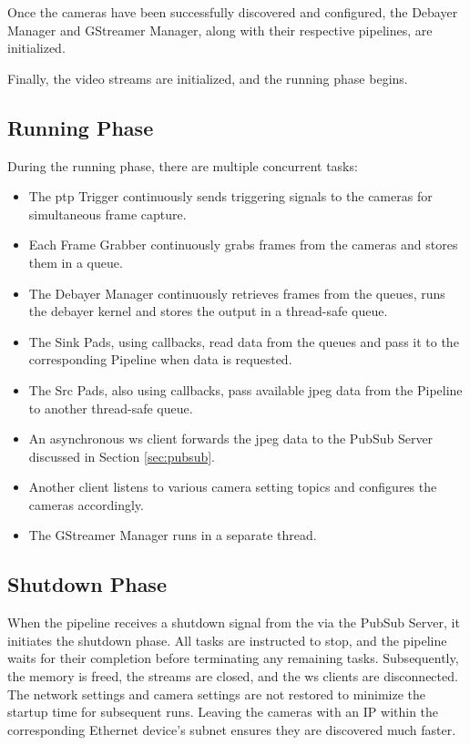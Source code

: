 Once the cameras have been successfully discovered and configured, the Debayer Manager and GStreamer Manager, along with their respective pipelines, are initialized.

Finally, the video streams are initialized, and the running phase begins.

\subsection{Running Phase}
During the running phase, there are multiple concurrent tasks:

\begin{itemize}
    \item The \gls{ptp} Trigger continuously sends triggering signals to the cameras for simultaneous frame capture.
    \item Each Frame Grabber continuously grabs frames from the cameras and stores them in a queue.
    \item The Debayer Manager continuously retrieves frames from the queues, runs the debayer kernel and stores the output in a thread-safe queue.
    \item The Sink Pads, using callbacks, read data from the queues and pass it to the corresponding Pipeline when data is requested.
    \item The Src Pads, also using callbacks, pass available \gls{jpeg} data from the Pipeline to another thread-safe queue.
    \item An asynchronous \gls{ws} client forwards the \gls{jpeg} data to the PubSub Server discussed in Section \ref{sec:pubsub}.
    \item Another client listens to various camera setting topics and configures the cameras accordingly.
    \item The GStreamer Manager runs in a separate thread.
\end{itemize}



\subsection{Shutdown Phase}

When the pipeline receives a shutdown signal from the \srgui via the PubSub Server, it initiates the shutdown phase.
All tasks are instructed to stop, and the pipeline waits for their completion before terminating any remaining tasks.
Subsequently, the memory is freed, the streams are closed, and the \gls{ws} clients are disconnected.
The network settings and camera settings are not restored to minimize the startup time for subsequent runs.
Leaving the cameras with an IP within the corresponding Ethernet device's subnet ensures they are discovered much faster.


